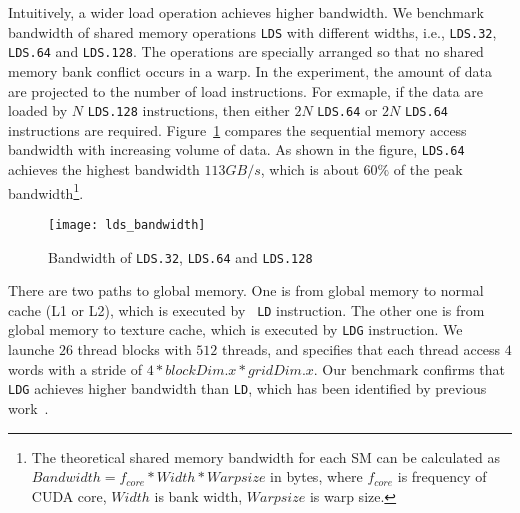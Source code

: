 Intuitively, a wider load operation achieves higher bandwidth. We benchmark bandwidth of shared memory operations {\tt LDS} with different widths, i.e., {\tt LDS.32}, {\tt LDS.64}
and {\tt LDS.128}. The operations are specially arranged so that no shared memory bank conflict occurs in a warp. In the
experiment, the amount of data are projected to the number of load instructions. For exmaple, if the data are loaded by
$N$ {\tt LDS.128} instructions, then either $2N$ {\tt LDS.64} or $2N$ {\tt LDS.64} instructions are required.
Figure~\ref{fig:lds_bw} compares the sequential memory access bandwidth with increasing volume of data. As shown in the figure, {\tt LDS.64} achieves the highest bandwidth $113GB/s$, which is about $60\%$ of the peak bandwidth\footnote{The theoretical shared memory bandwidth for each SM can be calculated as $Bandwidth=f_{core}*Width*Warpsize$ in
bytes, where $f_{core}$ is frequency of CUDA core, $Width$ is bank width, $Warpsize$ is warp size.}.

\begin{figure}[htbp]
\begin{center}
\texttt{[image: lds\_bandwidth]}
    \caption{ Bandwidth of {\tt LDS.32}, {\tt LDS.64} and {\tt LDS.128}}
\label{fig:lds_bw}
\end{center}
\end{figure}

There are two paths to global memory. One is from global memory to normal cache (L1 or L2), which is executed by {\tt
LD} instruction. The other one is from global memory to texture cache, which is executed by {\tt LDG} instruction. We
launche $26$ thread blocks with $512$ threads, and specifies that each thread access $4$ words with a stride of
$4*blockDim.x*gridDim.x$. Our benchmark confirms that {\tt LDG} achieves higher bandwidth than {\tt LD}, which has been
identified by previous work~\cite{tan}.
